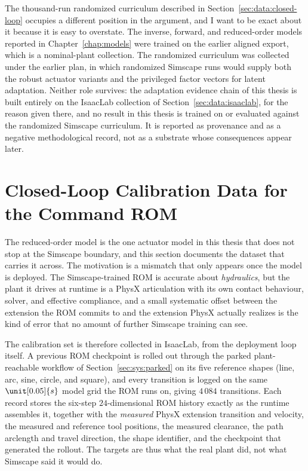 The thousand-run randomized curriculum described in
Section~\ref{sec:data:closed-loop} occupies a different position in the
argument, and I want to be exact about it because it is easy to
overstate. The inverse, forward, and reduced-order models reported in
Chapter~\ref{chap:models} were trained on the earlier aligned export,
which is a nominal-plant collection. The randomized curriculum was
collected under the earlier plan, in which randomized Simscape runs
would supply both the robust actuator variants and the privileged
factor vectors for latent adaptation. Neither role survives: the
adaptation evidence chain of this thesis is built entirely on the
IsaacLab collection of Section~\ref{sec:data:isaaclab}, for the reason
given there, and no result in this thesis is trained on or evaluated
against the randomized Simscape curriculum. It is reported as
provenance and as a negative methodological record, not as a substrate
whose consequences appear later.

\section{Closed-Loop Calibration Data for the Command ROM}
\label{sec:data:rom-calibration}

The reduced-order model is the one actuator model in this thesis that
does not stop at the Simscape boundary, and this section documents the
dataset that carries it across. The motivation is a mismatch that only
appears once the model is deployed. The Simscape-trained ROM is accurate
about \emph{hydraulics}, but the plant it drives at runtime is a PhysX
articulation with its own contact behaviour, solver, and effective
compliance, and a small systematic offset between the extension the ROM
commits to and the extension PhysX actually realizes is the kind of error that no amount of further Simscape training can see.

The calibration set is therefore collected in IsaacLab, from the
deployment loop itself. A previous ROM checkpoint is rolled out through
the parked plant-reachable workflow of Section~\ref{sec:sys:parked} on its five reference shapes
(line, arc, sine, circle, and square), and every transition is logged on the same $\unit[0.05]{s}$ model grid
the ROM runs on, giving $4\,084$ transitions. Each record stores the
six-step $24$-dimensional ROM history exactly as the runtime assembles
it, together with the \emph{measured} PhysX extension transition and
velocity, the measured and reference tool positions, the measured
clearance, the path arclength and travel direction, the shape
identifier, and the checkpoint that generated the rollout. The targets
are thus what the real plant did, not what Simscape said it would do.

